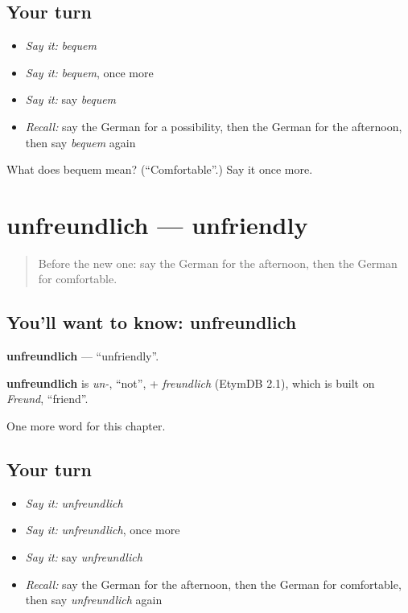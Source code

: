 \subsection*{Your turn}
\begin{itemize}
\raggedright
  \item \emph{Say it:} \emph{bequem}
  \item \emph{Say it:} \emph{bequem}, once more
  \item \emph{Say it:} say \emph{bequem}
  \item \emph{Recall:} say the German for a possibility, then the German for the afternoon, then say \emph{bequem} again
\end{itemize}

\begin{tcolorbox}[breakable,colback=teal!4,colframe=teal!35!black,title={Before you move on}]
What does bequem mean? (\textquotedblleft{}Comfortable\textquotedblright{}.) Say it once more.
\end{tcolorbox}
\section[unfreundlich]{unfreundlich — unfriendly}

\label{lesson:GE-C167-unfreundlich}



\begin{quote}
Before the new one: say the German for the afternoon, then the German for comfortable.
\end{quote}

\subsection*{You'll want to know: unfreundlich}
\textbf{unfreundlich} — \textquotedblleft{}unfriendly\textquotedblright{}.

\begin{cousinweb}
\textbf{unfreundlich} is \emph{un-}, \textquotedblleft{}not\textquotedblright{}, + \emph{freundlich} (EtymDB 2.1), which is built on \emph{Freund}, \textquotedblleft{}friend\textquotedblright{}.
\end{cousinweb}

\begin{grammarlens}[title={What you've built}]
One more word for this chapter.
\end{grammarlens}

\subsection*{Your turn}
\begin{itemize}
\raggedright
  \item \emph{Say it:} \emph{unfreundlich}
  \item \emph{Say it:} \emph{unfreundlich}, once more
  \item \emph{Say it:} say \emph{unfreundlich}
  \item \emph{Recall:} say the German for the afternoon, then the German for comfortable, then say \emph{unfreundlich} again
\end{itemize}

